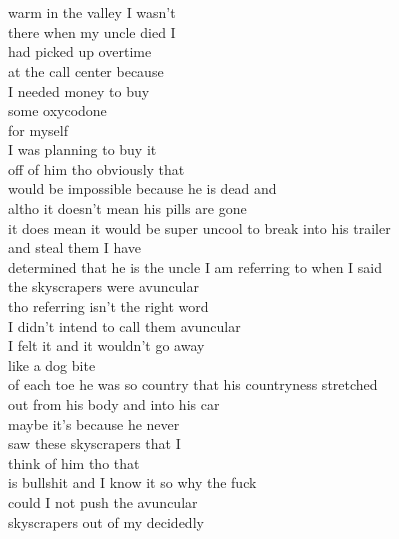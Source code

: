 \section*{\-\ \hspace*{\fill}  \thepage}
\label{sec:The_Uncle_Poem_cont}
\vspace*{0.5cm}
\begin{flushleft}
\begin{paracol}{3} %
warm in the valley I wasn’t\\
there when my uncle died I\\
had picked up overtime\\
at the call center because\\
I needed money to buy\\
some oxycodone\\
for myself\\
I was planning to buy it\\
off of him tho obviously that\\
would be impossible because he is dead and\\
altho it doesn’t mean his pills are gone\\
it does mean it would be super
uncool to break into his trailer\\
and steal them I have\\
determined that he is the uncle I am referring to when I said\\
the skyscrapers were avuncular\\
tho referring isn’t the right word\\
I didn’t intend to call them avuncular\\
I felt it and it wouldn’t go away\\
like a dog bite\\
\switchcolumn[1]
of each toe he was so country that his countryness stretched\\ 
out from his body and into his car\\
maybe it’s because he never\\
saw these skyscrapers that I\\
think of him tho that\\
is bullshit and I know it so why the fuck\\
could I not push the avuncular\\
skyscrapers out of my decidedly\\

\end{paracol}
\end{flushleft}
